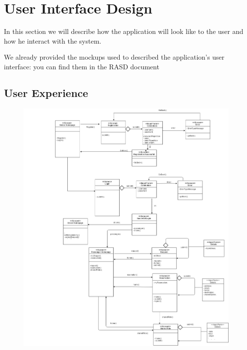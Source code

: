 \section{User Interface Design}
In this section we will describe how the application will look like to the user and how he interact with the system.

We already provided the mockups used to described the application's user interface: you can find them in the RASD document

\newpage
\subsection{User Experience}
\begin{figure}[h!]
	\centering
	\includegraphics[width=\textwidth]{uxmodel.png}
\end{figure}